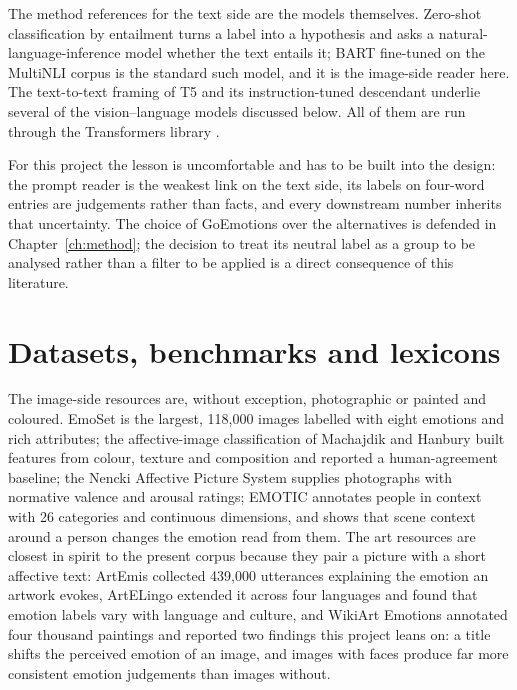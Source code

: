 The method references for the text side are the models themselves. Zero-shot classification by entailment \cite{yin2019benchmarking} turns a label into a hypothesis and asks a natural-language-inference model whether the text entails it; BART \cite{lewis2020bart} fine-tuned on the MultiNLI corpus \cite{williams2018broad} is the standard such model, and it is the image-side reader here. The text-to-text framing of T5 \cite{raffel2020exploring} and its instruction-tuned descendant \cite{chung2022scaling} underlie several of the vision--language models discussed below. All of them are run through the Transformers library \cite{wolf2020transformers}.

For this project the lesson is uncomfortable and has to be built into the design: the prompt reader is the weakest link on the text side, its labels on four-word entries are judgements rather than facts, and every downstream number inherits that uncertainty. The choice of GoEmotions over the alternatives is defended in Chapter~\ref{ch:method}; the decision to treat its neutral label as a group to be analysed rather than a filter to be applied is a direct consequence of this literature.

\section{Datasets, benchmarks and lexicons}
\label{sec:lit-data}

The image-side resources are, without exception, photographic or painted and coloured. EmoSet \cite{yang2023emoset} is the largest, 118,000 images labelled with eight emotions and rich attributes; the affective-image classification of Machajdik and Hanbury \cite{machajdik2010affective} built features from colour, texture and composition and reported a human-agreement baseline; the Nencki Affective Picture System \cite{marchewka2014nencki} supplies photographs with normative valence and arousal ratings; EMOTIC \cite{kosti2020context} annotates people in context with 26 categories and continuous dimensions, and shows that scene context around a person changes the emotion read from them. The art resources are closest in spirit to the present corpus because they pair a picture with a short affective text: ArtEmis \cite{achlioptas2021artemis} collected 439,000 utterances explaining the emotion an artwork evokes, ArtELingo \cite{mohamed2022artelingo} extended it across four languages and found that emotion labels vary with language and culture, and WikiArt Emotions \cite{mohammad2018wikiart} annotated four thousand paintings and reported two findings this project leans on: a title shifts the perceived emotion of an image, and images with faces produce far more consistent emotion judgements than images without.


